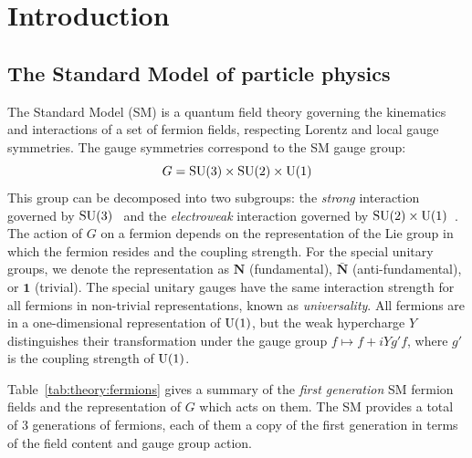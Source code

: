 \chapter{Introduction}
\label{sec:theory}

\section{The Standard Model of particle physics}

The Standard Model (SM) is a quantum field theory governing the kinematics and interactions of a set of fermion fields, respecting Lorentz and local gauge symmetries.
The gauge symmetries correspond to the SM gauge group:
\begin{equation}
 G = \operatorname{\mathrm{SU}}(3) \times \operatorname{\mathrm{SU}}(2) \times \operatorname{\mathrm{U}}(1)
\end{equation}
This group can be decomposed into two subgroups: the \emph{strong} interaction governed by ${\operatorname{\mathrm{SU}}(3)}$~\cite{qcd1,qcd2} and the \emph{electroweak} interaction governed by ${\operatorname{\mathrm{SU}}(2)\times\operatorname{\mathrm{U}}(1)}$~\cite{weak1,weak2,weak3}.
The action of ${G}$ on a fermion depends on the representation of the Lie group in which the fermion resides and the coupling strength.
For the special unitary groups, we denote the representation as ${\mathbf{N}}$ (fundamental), ${\bar{\mathbf{N}}}$ (anti-fundamental), or ${\mathbf{1}}$ (trivial).
The special unitary gauges have the same interaction strength for all fermions in non-trivial representations, known as \emph{universality}.
All fermions are in a one-dimensional representation of ${\operatorname{\mathrm{U}}(1)}$, but the weak hypercharge ${Y}$ distinguishes their transformation under the gauge group ${f\mapsto f + i Y g' f}$, where ${g'}$ is the coupling strength of ${\operatorname{\mathrm{U}}(1)}$.

Table~\ref{tab:theory:fermions} gives a summary of the \emph{first generation} SM fermion fields and the representation of ${G}$ which acts on them.
The SM provides a total of 3 generations of fermions, each of them a copy of the first generation in terms of the field content and gauge group action.

